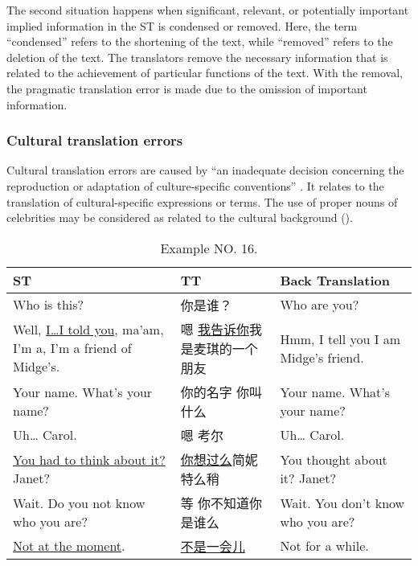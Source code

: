 \documentclass[english]{textolivre}
\begin{document}
The second situation happens when significant, relevant, or potentially important implied information in the ST is condensed or removed. Here, the term “condensed” refers to the shortening of the text, while “removed” refers to the deletion of the text. The translators remove the necessary information that is related to the achievement of particular functions of the text. With the removal, the pragmatic translation error is made due to the omission of important information. 

\subsubsection{Cultural translation errors}
Cultural translation errors are caused by “an inadequate decision concerning the reproduction or adaptation of culture-specific conventions” \cite[p. 177]{nord_text_1997}. It relates to the translation of cultural-specific expressions or terms. The use of proper nouns of celebrities may be considered as related to the cultural background (). 

\begin{table}[htpb]
\caption{Example NO. 16.}
\label{tbl16}
\begin{tabularx}{\linewidth}{XXX}
\toprule 
ST  & TT & Back Translation \\ 
\midrule
Who is this? & 你是谁？& Who are you? \\

Well, \underline{I…I told you}, ma'am, I'm a, I'm a friend of Midge's. & 嗯 \underline{我告诉你}我是麦琪的一个朋友 & Hmm, I tell you I am Midge's friend. \\

Your name. What's your name? & 你的名字 你叫什么 & Your name. What's your name? \\

Uh… Carol.  & 嗯 考尔  & Uh… Carol.  \\

\underline{You had to think about it?} Janet? & \underline{你想过么}简妮特么稍 & You thought about it? Janet?  \\

Wait. Do you not know who you are? & 等 你不知道你是谁么 & Wait. You don't know who you are? \\

\underline{Not at the moment}.  &  \underline{不是一会儿}  & Not for a while. \\ 
\bottomrule
\end{tabularx}
\end{table}
\end{document}
